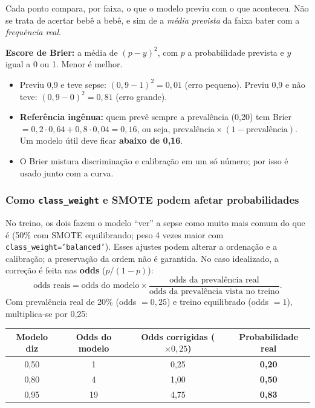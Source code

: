 \documentclass[11pt,a4paper]{article}
\newcommand{\cod}[1]{\texttt{#1}}
\begin{document}
Cada ponto compara, por faixa, o que o modelo previu com o que aconteceu. Não se trata de acertar bebê a bebê, e sim de a \emph{média prevista} da faixa bater com a \emph{frequência real}.

\textbf{Escore de Brier:} a média de $(p-y)^2$, com $p$ a probabilidade prevista e $y$ igual a 0 ou 1. Menor é melhor.
\begin{itemize}
  \item Previu 0,9 e teve sepse: $(0{,}9-1)^2 = 0{,}01$ (erro pequeno). Previu 0,9 e não teve: $(0{,}9-0)^2 = 0{,}81$ (erro grande).
  \item \textbf{Referência ingênua:} quem prevê sempre a prevalência (0,20) tem Brier $=0{,}2\cdot0{,}64+0{,}8\cdot0{,}04 = 0{,}16$, ou seja, $\text{prevalência}\times(1-\text{prevalência})$. Um modelo útil deve ficar \textbf{abaixo de 0,16}.
  \item O Brier mistura discriminação e calibração em um só número; por isso é usado junto com a curva.
\end{itemize}

\subsubsection*{Como \texttt{class\_weight} e SMOTE podem afetar probabilidades}

No treino, os dois fazem o modelo ``ver'' a sepse como muito mais comum do que é (50\% com SMOTE equilibrando; peso 4 vezes maior com \cod{class\_weight='balanced'}). Esses ajustes podem alterar a ordenação e a calibração; a preservação da ordem não é garantida. No caso idealizado, a correção é feita nas \textbf{odds} ($p/(1-p)$):
\[
\text{odds reais} = \text{odds do modelo}\times\frac{\text{odds da prevalência real}}{\text{odds da prevalência vista no treino}}.
\]
Com prevalência real de 20\% (odds $=0{,}25$) e treino equilibrado (odds $=1$), multiplica-se por 0,25:

\begin{center}
\small
\begin{tabular}{@{}cccc@{}}
\toprule
\textbf{Modelo diz} & \textbf{Odds do modelo} & \textbf{Odds corrigidas} ($\times 0{,}25$) & \textbf{Probabilidade real} \\
\midrule
0,50 & 1 & 0,25 & \textbf{0,20} \\
0,80 & 4 & 1,00 & \textbf{0,50} \\
0,95 & 19 & 4,75 & \textbf{0,83} \\
\bottomrule
\end{tabular}
\end{center}
\end{document}
